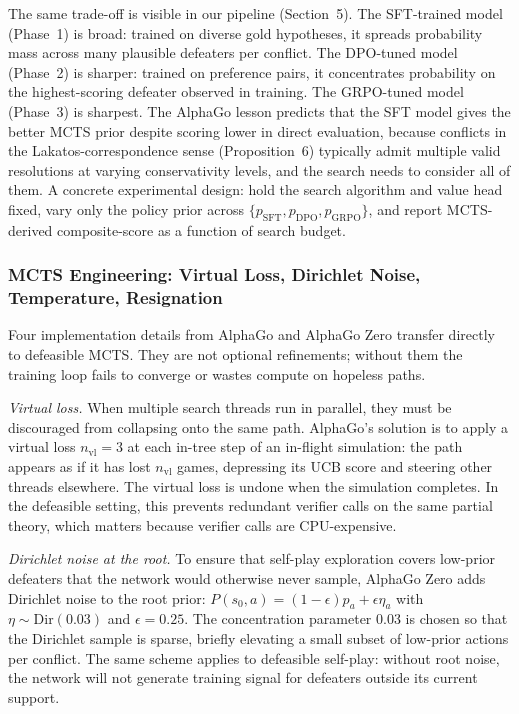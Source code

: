 \documentclass{article}
\begin{document}
The same trade-off is visible in our pipeline (Section~5). The SFT-trained model (Phase~1) is broad: trained on diverse gold hypotheses, it spreads probability mass across many plausible defeaters per conflict. The DPO-tuned model (Phase~2) is sharper: trained on preference pairs, it concentrates probability on the highest-scoring defeater observed in training. The GRPO-tuned model (Phase~3) is sharpest. The AlphaGo lesson predicts that the SFT model gives the better MCTS prior despite scoring lower in direct evaluation, because conflicts in the Lakatos-correspondence sense (Proposition~6) typically admit multiple valid resolutions at varying conservativity levels, and the search needs to consider all of them. A concrete experimental design: hold the search algorithm and value head fixed, vary only the policy prior across $\{p_{\mathrm{SFT}}, p_{\mathrm{DPO}}, p_{\mathrm{GRPO}}\}$, and report MCTS-derived composite-score as a function of search budget.

\subsubsection{MCTS Engineering: Virtual Loss, Dirichlet Noise, Temperature, Resignation}

Four implementation details from AlphaGo and AlphaGo Zero transfer directly to defeasible MCTS. They are not optional refinements; without them the training loop fails to converge or wastes compute on hopeless paths.

\textit{Virtual loss.} When multiple search threads run in parallel, they must be discouraged from collapsing onto the same path. AlphaGo's solution is to apply a virtual loss $n_{\mathrm{vl}} = 3$ at each in-tree step of an in-flight simulation: the path appears as if it has lost $n_{\mathrm{vl}}$ games, depressing its UCB score and steering other threads elsewhere. The virtual loss is undone when the simulation completes. In the defeasible setting, this prevents redundant verifier calls on the same partial theory, which matters because verifier calls are CPU-expensive.

\textit{Dirichlet noise at the root.} To ensure that self-play exploration covers low-prior defeaters that the network would otherwise never sample, AlphaGo Zero adds Dirichlet noise to the root prior: $P(s_0, a) = (1 - \epsilon) p_a + \epsilon \eta_a$ with $\eta \sim \mathrm{Dir}(0.03)$ and $\epsilon = 0.25$. The concentration parameter 0.03 is chosen so that the Dirichlet sample is sparse, briefly elevating a small subset of low-prior actions per conflict. The same scheme applies to defeasible self-play: without root noise, the network will not generate training signal for defeaters outside its current support.
\end{document}
